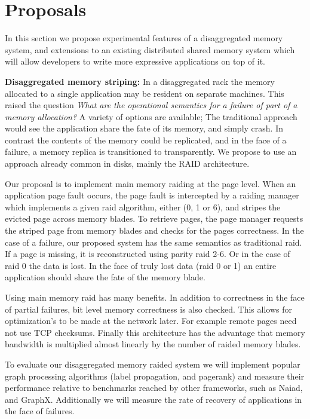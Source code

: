 \section{Proposals}
\label{sec:proposal}
In this section we propose experimental features of a disaggregated
memory system, and extensions to an existing distributed shared memory
system which will allow developers to write more expressive
applications on top of it.


\textbf{Disaggregated memory striping:} In a disaggregated
rack the memory allocated to a single application may be resident on
separate machines. This raised the question \emph{What are the operational
semantics for a failure of part of a memory allocation?} A variety of
options are available; The traditional approach would see the
application share the fate of its memory, and simply crash. In
contrast the contents of the memory could be replicated, and in the
face of a failure, a memory replica is transitioned to transparently.
We propose to use an approach already common in disks, mainly the RAID
architecture.

Our proposal is to implement main memory raiding at the page level.
When an application page fault occurs, the page fault is intercepted
by a raiding manager which implements a given raid algorithm, either
(0, 1 or 6), and stripes the evicted page across memory blades. To
retrieve pages, the page manager requests the striped page from memory
blades and checks for the pages correctness. In the case of a failure,
our proposed system has the same semantics as traditional raid. If a
page is missing, it is reconstructed using parity raid 2-6. Or in the
case of raid 0 the data is lost. In the face of truly lost data (raid
0 or 1) an entire application should share the fate of the memory
blade.

Using main memory raid has many benefits. In addition to correctness
in the face of partial failures, bit level memory correctness is also
checked.  This allows for optimization's to be made at the network
later. For example remote pages need not use TCP checksums. Finally
this architecture has the advantage that memory bandwidth is
multiplied almost linearly by the number of raided memory blades.

To evaluate our disaggregated memory raided system we will implement
popular graph processing algorithms (label propagation, and pagerank)
and measure their performance relative to benchmarks reached by other
frameworks, such as Naiad, and GraphX. Additionally we will measure
the rate of recovery of applications in the face of failures. 

